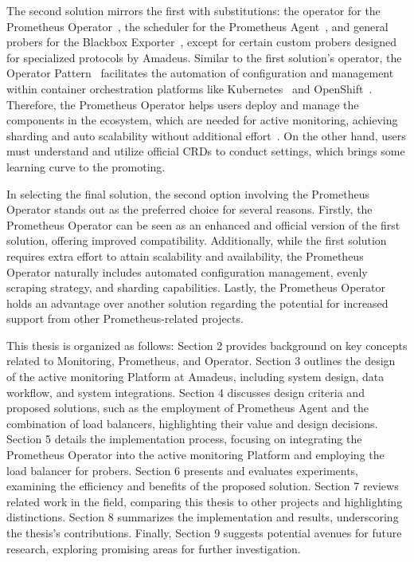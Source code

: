 The second solution mirrors the first with substitutions: the operator for the Prometheus Operator~\parencite{PrometheusOperator}, the scheduler for the Prometheus Agent~\parencite{PrometheusAgentSupport}, and general probers for the Blackbox Exporter~\parencite{BlackboxExporter}, except for certain custom probers designed for specialized protocols by Amadeus. Similar to the first solution's operator, the Operator Pattern~\parencite{OperatorPattern} facilitates the automation of configuration and management within container orchestration platforms like Kubernetes~\parencite{ProductionGradeContainerOrchestration} and OpenShift~\parencite{RedHatOpenShift}. Therefore, the Prometheus Operator helps users deploy and manage the components in the ecosystem, which are needed for active monitoring, achieving sharding and auto scalability without additional effort~\parencite{plotkaIntroducingPrometheusAgent2021}. On the other hand, users must understand and utilize official \ac{CRD}s to conduct settings, which brings some learning curve to the promoting. 

In selecting the final solution, the second option involving the Prometheus Operator stands out as the preferred choice for several reasons. Firstly, the Prometheus Operator can be seen as an enhanced and official version of the first solution, offering improved compatibility. Additionally, while the first solution requires extra effort to attain scalability and availability, the Prometheus Operator naturally includes automated configuration management, evenly scraping strategy, and sharding capabilities. Lastly, the Prometheus Operator holds an advantage over another solution regarding the potential for increased support from other Prometheus-related projects. 

This thesis is organized as follows: Section 2 provides background on key concepts related to Monitoring, Prometheus, and Operator. Section 3 outlines the design of the active monitoring Platform at Amadeus, including system design, data workflow, and system integrations. Section 4 discusses design criteria and proposed solutions, such as the employment of Prometheus Agent and the combination of load balancers, highlighting their value and design decisions. Section 5 details the implementation process, focusing on integrating the Prometheus Operator into the active monitoring Platform and employing the load balancer for probers. Section 6 presents and evaluates experiments, examining the efficiency and benefits of the proposed solution. Section 7 reviews related work in the field, comparing this thesis to other projects and highlighting distinctions. Section 8 summarizes the implementation and results, underscoring the thesis's contributions. Finally, Section 9 suggests potential avenues for future research, exploring promising areas for further investigation. 


